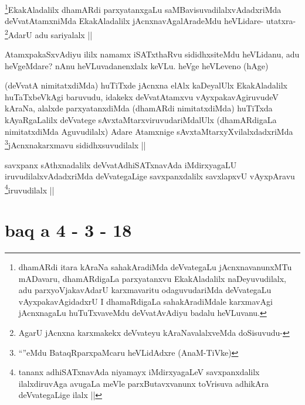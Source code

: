 
\begin{artha}
\footnote{dhamARdi itara kAraNa sahakAradiMda deVvategaLu jAcnxnavanunxMTu mADavaru, dhamARdigaLa parxyatanxvu EkakAladalilx naDeyuvudilalx, adu parxyoVjakavAdarU karxmavaritu odaguvudariMda deVvategaLu vAyxpakavAgidadxrU I dhamaRdigaLa sahakAradiMdale karxmavAgi jAcnxnagaLu huTuTxvaveMdu deVvatAvAdiyu badalu heVLuvanu.}EkakAladalilx dhamARdi parxyatanxgaLu saMBavisuvadilalxvAdadxriMda deVvatAtamxniMda EkakAladalilx jAcnxnavAgalAradeMdu heVLidare- utatxra- \footnote{AgarU jAcnxna karxmakekx deVvateyu kAraNavalalxveMda doSisuvudu-}AdarU adu sariyalalx ||
\end{artha}

\begin{artha}
AtamxpakaSxvAdiyu ililx namamx iSATxthaRvu sididhxsiteMdu heVLidanu, adu heVgeMdare? nAnu heVLuvadanenxlalx keVLu. heVge heVLeveno (hAge) 
\end{artha}

\begin{artha}
(deVvatA nimitatxdiMda) huTiTxde jAcnxna elAlx kaDeyalUlx EkakAladalilx huTaTxbeVkAgi baruvudu, idakekx deVvatAtamxvu vAyxpakavAgiruvudeV kAraNa, alalxde parxyatanxdiMda (dhamARdi nimitatxdiMda) huTiTxda kAyaRgaLalilx deVvatege sAvxtaMtarxviruvudariMdalUlx (dhamARdigaLa nimitatxdiMda Aguvudilalx) Adare Atamxnige sAvxtaMtarxyXvilalxdadxriMda \footnote{``\stext''eMdu BataqRparxpaMcaru heVLidAdxre (AnaM-TiVke)}jAcnxnakarxmavu sididhxsuvudilalx ||
\end{artha}


\begin{artha}
savxpanx sAthxnadalilx deVvatAdhiSATxnavAda iMdirxyagaLU iruvudilalxvAdadxriMda deVvategaLige savxpanxdalilx savxlapxvU vAyxpAravu \footnote{tananx adhiSATxnavAda niyamayx iMdirxyagaLeV savxpanxdalilx ilalxdiruvAga avugaLa meVle parxButavxvanunx toVrisuva adhikAra deVvategaLige ilalx ||}iruvudilalx ||
\end{artha}

\section*{baq a 4 - 3 - 18}


